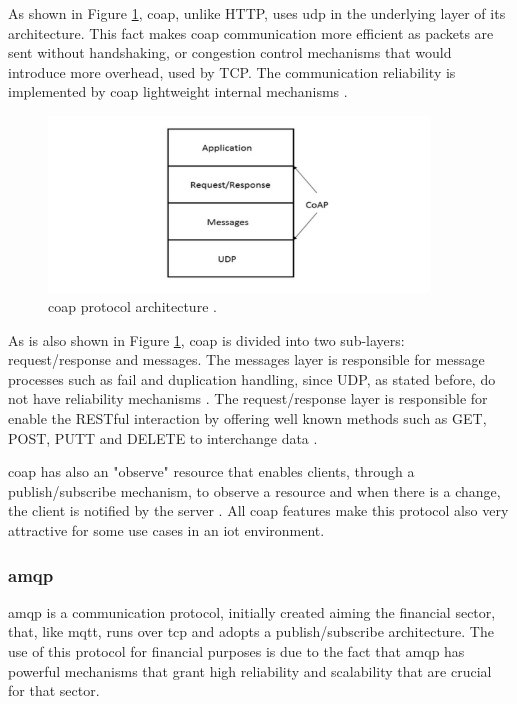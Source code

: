 As shown in Figure \ref{fig:coap}, \ac{coap}, unlike HTTP, uses \ac{udp} in the underlying layer of its architecture. This fact makes \ac{coap} communication more efficient as packets are sent without handshaking, or congestion control mechanisms that would introduce more overhead, used by TCP. The communication reliability is implemented by \ac{coap} lightweight internal mechanisms \cite{Salman2013}.

\begin{figure}[H]
	\centering
	\includegraphics[width=0.9\textwidth]{figures/coap.png}
	\caption{\ac{coap} protocol architecture \cite{Mehboob2016}.}
	\label{fig:coap}
\end{figure}

As is also shown in Figure \ref{fig:coap}, \ac{coap} is divided into two sub-layers: request/response and messages. The messages layer is responsible for message processes such as fail and duplication handling, since UDP, as stated before, do not have reliability mechanisms \cite{Salman2013}. The request/response layer is responsible for enable the RESTful interaction by offering well known methods such as GET, POST, PUTT and DELETE to interchange data \cite{Lerche2012}.

\ac{coap} has also an "observe" resource that enables clients, through a publish/subscribe mechanism, to observe a resource and when there is a change, the client is notified by the server \cite{Lerche2012}. All \ac{coap} features make this protocol also very attractive for some use cases in an \ac{iot} environment.


\subsubsection{\acf{amqp}}

\acf{amqp} is a communication protocol, initially created aiming the financial sector, that, like \ac{mqtt}, runs over \ac{tcp} and adopts a publish/subscribe architecture. The use of this protocol for financial purposes is due to the fact that \ac{amqp} has powerful mechanisms that grant high reliability and scalability that are crucial for that sector.

